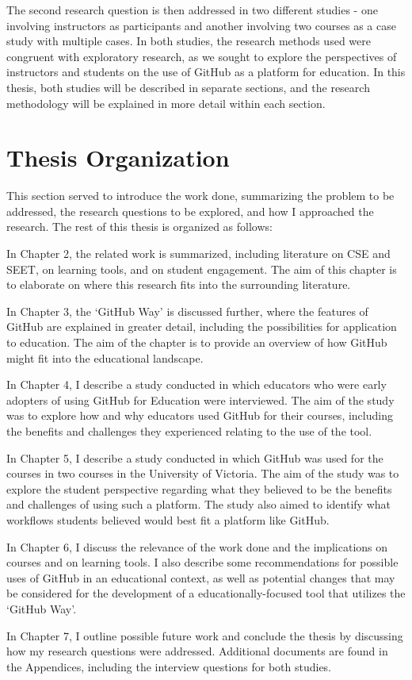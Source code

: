 The second research question is then addressed in two different studies - one involving instructors as participants and another involving two courses as a case study with multiple cases. In both studies, the research methods used were congruent with exploratory research, as we sought to explore the perspectives of instructors and students on the use of GitHub as a platform for education. In this thesis, both studies will be described in separate sections, and the research methodology will be explained in more detail within each section.

\section{Thesis Organization}
This section served to introduce the work done, summarizing the problem to be addressed, the research questions to be explored, and how I approached the research. The rest of this thesis is organized as follows:

In Chapter 2, the related work is summarized, including literature on CSE and SEET, on learning tools, and on student engagement. The aim of this chapter is to elaborate on where this research fits into the surrounding literature.

In Chapter 3, the `GitHub Way' is discussed further, where the features of GitHub are explained in greater detail, including the possibilities for application to education. The aim of the chapter is to provide an overview of how GitHub might fit into the educational landscape.

In Chapter 4, I describe a study conducted in which educators who were early adopters of using GitHub for Education were interviewed. The aim of the study was to explore how and why educators used GitHub for their courses, including the benefits and challenges they experienced relating to the use of the tool.

In Chapter 5, I describe a study conducted in which GitHub was used for the courses in two courses in the University of Victoria. The aim of the study was to explore the student perspective regarding what they believed to be the benefits and challenges of using such a platform. The study also aimed to identify what workflows students believed would best fit a platform like GitHub.

In Chapter 6, I discuss the relevance of the work done and the implications on courses and on learning tools. I also describe some recommendations for possible uses of GitHub in an educational context, as well as potential changes that may be considered for the development of a educationally-focused tool that utilizes the `GitHub Way'.

In Chapter 7, I outline possible future work and conclude the thesis by discussing how my research questions were addressed. Additional documents are found in the Appendices, including the interview questions for both studies.



